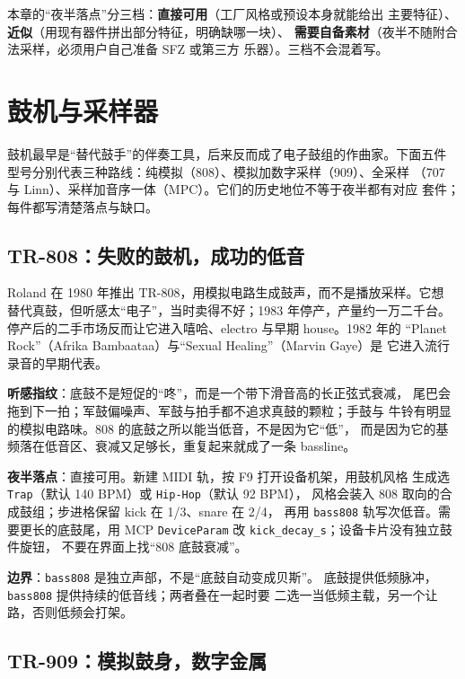 本章的“夜半落点”分三档：\textbf{直接可用}（工厂风格或预设本身就能给出
主要特征）、\textbf{近似}（用现有器件拼出部分特征，明确缺哪一块）、
\textbf{需要自备素材}（夜半不随附合法采样，必须用户自己准备 SFZ 或第三方
乐器）。三档不会混着写。

\section{鼓机与采样器}
\label{sec:iconic-drum-machines}

鼓机最早是“替代鼓手”的伴奏工具，后来反而成了电子鼓组的作曲家。下面五件
型号分别代表三种路线：纯模拟（808）、模拟加数字采样（909）、全采样
（707 与 Linn）、采样加音序一体（MPC）。它们的历史地位不等于夜半都有对应
套件；每件都写清楚落点与缺口。

\subsection{TR-808：失败的鼓机，成功的低音}
\label{sec:iconic-808}

Roland 在 1980 年推出 TR-808，用模拟电路生成鼓声，而不是播放采样。它想
替代真鼓，但听感太“电子”，当时卖得不好；1983 年停产，产量约一万二千台。
停产后的二手市场反而让它进入嘻哈、electro 与早期 house。1982 年的
“Planet Rock”（Afrika Bambaataa）与“Sexual Healing”（Marvin Gaye）是
它进入流行录音的早期代表。

\textbf{听感指纹}：底鼓不是短促的“咚”，而是一个带下滑音高的长正弦式衰减，
尾巴会拖到下一拍；军鼓偏噪声、军鼓与拍手都不追求真鼓的颗粒；手鼓与
牛铃有明显的模拟电路味。808 的底鼓之所以能当低音，不是因为它“低”，
而是因为它的基频落在低音区、衰减又足够长，重复起来就成了一条 bassline。

\textbf{夜半落点}：直接可用。新建 MIDI 轨，按 F9 打开设备机架，用鼓机风格
生成选 \texttt{Trap}（默认 140 BPM）或 \texttt{Hip-Hop}（默认 92 BPM），
风格会装入 808 取向的合成鼓组；步进格保留 kick 在 1/3、snare 在 2/4，
再用 \texttt{bass808} 轨写次低音。需要更长的底鼓尾，用 MCP
\texttt{DeviceParam} 改 \texttt{kick\_decay\_s}；设备卡片没有独立鼓件旋钮，
不要在界面上找“808 底鼓衰减”。

\textbf{边界}：\texttt{bass808} 是独立声部，不是“底鼓自动变成贝斯”。
底鼓提供低频脉冲，\texttt{bass808} 提供持续的低音线；两者叠在一起时要
二选一当低频主载，另一个让路，否则低频会打架。

\subsection{TR-909：模拟鼓身，数字金属}
\label{sec:iconic-909}

